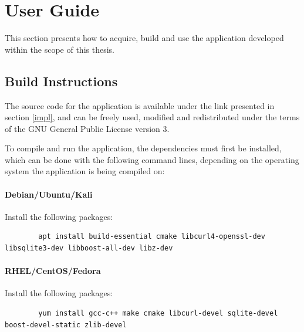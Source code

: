 \documentclass[a4paper,12pt]{article}
\begin{document}
\section{User Guide}
 

	This section presents how to acquire, build and use the application developed within the scope of this thesis.
	
\subsection{Build Instructions}
 
	
	The source code for the application is available under the link presented in section \ref{impl}, and can be freely used, modified and redistributed under the terms of the GNU General Public License version 3\cite{gplv3}.
	
	To compile and run the application, the dependencies must first be installed, which can be done with the following command lines, depending on the operating system the application is being compiled on:
	
	\vspace{-0.1in}
	\paragraph*{Debian/Ubuntu/Kali} Install the following packages:
	
	\begin{listing}[H]
	\begin{verbatim}
		apt install build-essential cmake libcurl4-openssl-dev libsqlite3-dev libboost-all-dev libz-dev
	\end{verbatim}
	\end{listing}
		
	\vspace{-0.4in}
	\paragraph*{RHEL/CentOS/Fedora} Install the following packages:
	
	\begin{listing}[H]
	\begin{verbatim}
		yum install gcc-c++ make cmake libcurl-devel sqlite-devel boost-devel-static zlib-devel
	\end{verbatim}
	\end{listing}
		
\end{document}
